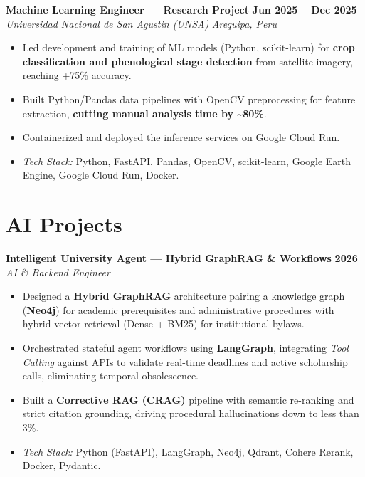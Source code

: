 \documentclass[11pt,letterpaper]{article}
\newcommand{\cventry}[4]{%
  \textbf{#1} \hfill \textbf{#2}\\
  \textit{#3} \hfill \textit{#4}\par\nobreak\vspace{1pt}%
}
\begin{document}
\cventry{Machine Learning Engineer --- Research Project}{Jun 2025 -- Dec 2025}{Universidad Nacional de San Agustin (UNSA)}{Arequipa, Peru}
\begin{itemize}
  \item Led development and training of ML models (Python, scikit-learn) for \textbf{crop classification and phenological stage detection} from satellite imagery, reaching +75\% accuracy.
  \item Built Python/Pandas data pipelines with OpenCV preprocessing for feature extraction, \textbf{cutting manual analysis time by \textasciitilde80\%}.
  \item Containerized and deployed the inference services on Google Cloud Run.
  \item \textit{Tech Stack:} Python, FastAPI, Pandas, OpenCV, scikit-learn, Google Earth Engine, Google Cloud Run, Docker.
\end{itemize}

\section{AI Projects}

\cventry{Intelligent University Agent --- Hybrid GraphRAG \& Workflows}{2026}{AI \& Backend Engineer}{}
\begin{itemize}
  \item Designed a \textbf{Hybrid GraphRAG} architecture pairing a knowledge graph (\textbf{Neo4j}) for academic prerequisites and administrative procedures with hybrid vector retrieval (Dense + BM25) for institutional bylaws.
  \item Orchestrated stateful agent workflows using \textbf{LangGraph}, integrating \textit{Tool Calling} against APIs to validate real-time deadlines and active scholarship calls, eliminating temporal obsolescence.
  \item Built a \textbf{Corrective RAG (CRAG)} pipeline with semantic re-ranking and strict citation grounding, driving procedural hallucinations down to less than 3\%.
  \item \textit{Tech Stack:} Python (FastAPI), LangGraph, Neo4j, Qdrant, Cohere Rerank, Docker, Pydantic.
\end{itemize}
\end{document}
